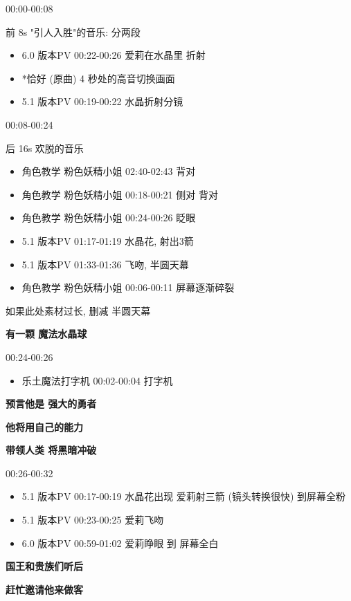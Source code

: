 \documentclass[a4paper]{article}
\begin{document}
00:00-00:08

前 8s "引人入胜"的音乐: 分两段

\begin{itemize}
    \item 6.0 版本PV 00:22-00:26 爱莉在水晶里 折射
    \item *恰好 (原曲) 4 秒处的高音切换画面
    \item 5.1 版本PV 00:19-00:22 水晶折射分镜
\end{itemize}

00:08-00:24

后 16s 欢脱的音乐

\begin{itemize}
    \item 角色教学 粉色妖精小姐 02:40-02:43 背对
    \item 角色教学 粉色妖精小姐 00:18-00:21 侧对 背对
    \item 角色教学 粉色妖精小姐 00:24-00:26 眨眼
    \item 5.1 版本PV 01:17-01:19 水晶花, 射出3箭
    \item 5.1 版本PV 01:33-01:36 飞吻, 半圆天幕
    \item 角色教学 粉色妖精小姐 00:06-00:11 屏幕逐渐碎裂
\end{itemize}

如果此处素材过长, 删减 半圆天幕

\textbf{有一颗 魔法水晶球}

00:24-00:26

\begin{itemize}
    \item 乐土魔法打字机 00:02-00:04 打字机
\end{itemize}

\textbf{预言他是 强大的勇者}

\textbf{他将用自己的能力}

\textbf{带领人类 将黑暗冲破}

00:26-00:32

\begin{itemize}
    \item 5.1 版本PV 00:17-00:19 水晶花出现 爱莉射三箭 (镜头转换很快) 到屏幕全粉
    \item 5.1 版本PV 00:23-00:25 爱莉飞吻
    \item 6.0 版本PV 00:59-01:02 爱莉睁眼 到 屏幕全白
\end{itemize}

\textbf{国王和贵族们听后}

\textbf{赶忙邀请他来做客}
\end{document}
